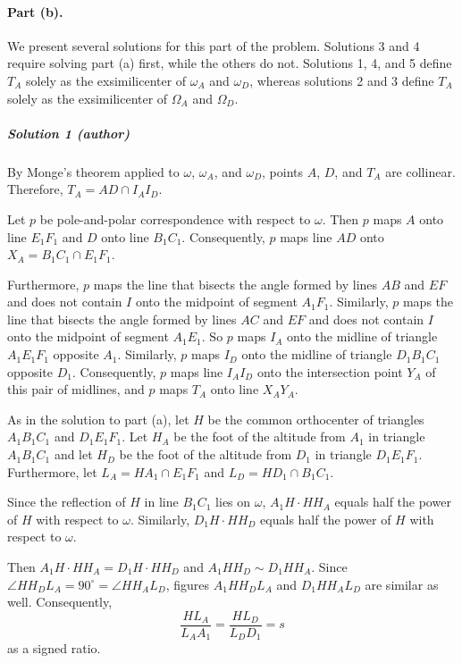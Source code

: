 \paragraph{Part (b).}
We present several solutions for this part of the problem. Solutions 3 and 4
require solving part (a) first, while the others do not. Solutions 1, 4, and 5
define $T_A$ solely as the exsimilicenter of $\omega_A$ and $\omega_D$, whereas
solutions 2 and 3 define $T_A$ solely as the exsimilicenter of $\Omega_A$ and
$\Omega_D$.

\subparagraph{Solution 1 (author)}

By Monge's theorem applied to $\omega$, $\omega_A$, and $\omega_D$,
points $A$, $D$, and $T_A$ are collinear. Therefore, $T_A= AD\cap I_AI_D$.

Let $p$ be pole-and-polar correspondence with respect to $\omega$. Then $p$ maps
$A$ onto line $E_1F_1$ and $D$ onto line $B_1C_1$. Consequently, $p$ maps line
$AD$ onto $X_A=B_1C_1\cap E_1F_1$.

Furthermore, $p$ maps the line that bisects the angle formed by lines $AB$ and
$EF$ and does not contain $I$ onto the midpoint of segment $A_1F_1$. Similarly,
$p$ maps the line that bisects the angle formed by lines $AC$ and $EF$ and does
not contain $I$ onto the midpoint of segment $A_1E_1$. So $p$ maps $I_A$ onto
the midline of triangle $A_1E_1F_1$ opposite $A_1$. Similarly, $p$ maps $I_D$
onto the midline of triangle $D_1B_1C_1$ opposite $D_1$. Consequently, $p$ maps
line $I_AI_D$ onto the intersection point $Y_A$ of this pair of midlines, and
$p$ maps $T_A$ onto line $X_AY_A$.

As in the solution to part (a), let $H$ be the common orthocenter of triangles
$A_1B_1C_1$ and $D_1E_1F_1$. Let $H_A$ be the foot of the altitude from $A_1$ in
triangle $A_1B_1C_1$ and let $H_D$ be the foot of the altitude from $D_1$ in
triangle $D_1E_1F_1$. Furthermore, let $L_A=HA_1\cap E_1F_1$ and $L_D=HD_1\cap
B_1C_1$.

Since the reflection of $H$ in line $B_1C_1$ lies on $\omega$, $A_1H \cdot HH_A$ equals half the power of $H$ with respect to $\omega$. Similarly, $D_1H \cdot HH_D$ equals half the power of $H$ with respect to $\omega$.

Then $A_1H \cdot HH_A = D_1H \cdot HH_D$ and $A_1HH_D\sim D_1HH_A$. Since
$\angle HH_DL_A = 90^\circ = \angle HH_AL_D$, figures $A_1HH_DL_A$ and
$D_1HH_AL_D$ are similar as well. Consequently,
\[
  \frac{HL_A}{L_AA_1}=\frac{HL_D}{L_DD_1}=s
\]
as a signed ratio.

